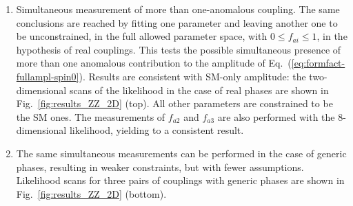 \begin{enumerate}
  \item Simultaneous measurement of more than one-anomalous coupling.
    The same conclusions are reached by fitting one parameter and
    leaving another one to be unconstrained, in the full allowed
    parameter space, with $0\le f_{ai}\le 1$, in the hypothesis of
    real couplings. This tests the possible simultaneous
    presence of more than one anomalous contribution to the amplitude
    of Eq.~(\ref{eq:formfact-fullampl-spin0}). Results are consistent
    with SM-only amplitude: the two-dimensional scans of the
    likelihood in the case of real phases are shown in
    Fig.~\ref{fig:results_ZZ_2D} (top). All other parameters are
    constrained to be the SM ones. The measurements of $f_{a2}$ and $f_{a3}$ are also
    performed with the 8-dimensional likelihood, yielding to a consistent result.
\item The same simultaneous measurements can be performed in the case
  of generic phases, resulting in weaker constraints, but with fewer
  assumptions. Likelihood scans for three pairs of couplings with
  generic phases are shown in Fig.~\ref{fig:results_ZZ_2D} (bottom).


\end{enumerate}
